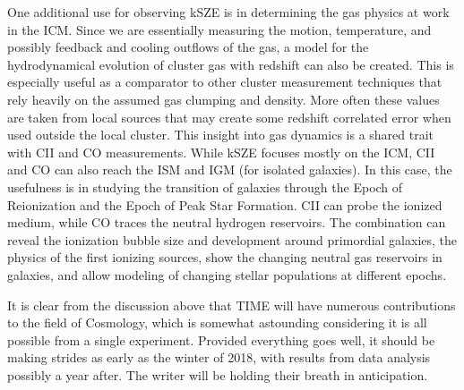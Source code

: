 \documentclass[manuscript]{aastex}
\begin{document}
One additional use for observing kSZE is in determining the gas physics at work in the ICM. Since we are essentially measuring the motion, temperature, and possibly feedback and cooling outflows of the gas, a model for the hydrodynamical evolution of cluster gas with redshift can also be created. This is especially useful as a comparator to other cluster measurement techniques that rely heavily on the assumed gas clumping and density. More often these values are taken from local sources that may create some redshift correlated error when used outside the local cluster. This insight into gas dynamics is a shared trait with CII and CO measurements. While kSZE focuses mostly on the ICM, CII and CO can also reach the ISM and IGM (for isolated galaxies). In this case, the usefulness is in studying the transition of galaxies through the Epoch of Reionization and the Epoch of Peak Star Formation. CII can probe the ionized medium, while CO traces the neutral hydrogen reservoirs. The combination can reveal the ionization bubble size and development around primordial galaxies, the physics of the first ionizing sources, show the changing neutral gas reservoirs in galaxies, and allow modeling of changing stellar populations at different epochs. 

It is clear from the discussion above that TIME will have numerous contributions to the field of Cosmology, which is somewhat astounding considering it is all possible from a single experiment. Provided everything goes well, it should be making strides as early as the winter of 2018, with results from data analysis possibly a year after. The writer will be holding their breath in anticipation. 

\newpage
\renewcommand\bibsection{\section{\refname}}



\newpage
\appendix
\end{document}
